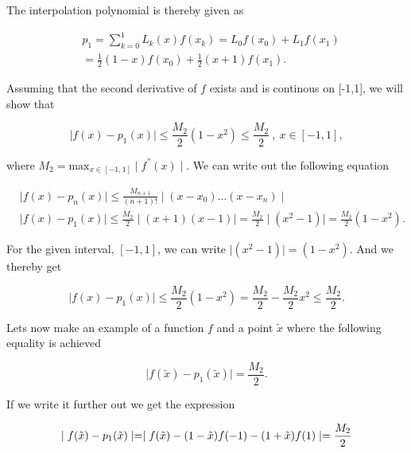 The interpolation polynomial is thereby given as

\begin{equation}
\label{eq: interpolation poly}
\begin{split}
& p_{1}=\sum\limits_{k=0}^1 L_{k}(x)f(x_{k})=L_{0}f(x_{0})+L_{1}f(x_{1})\\
&=\frac{1}{2}(1-x)f(x_{0})+\frac{1}{2}(x+1)f(x_{1}).
\end{split}
\end{equation}

Assuming that the second derivative of $f$ exists and is continous on [-1,1], we will show that

\begin{equation}
\label{eq: ineq Lagrange}
\mid f(x)-p_{1}(x)\mid \leq \frac{M_{2}}{2}(1-x^{2})\leq\frac{M_{2}}{2} \: , \: x\in[-1,1] ,
\end{equation}

where $M_{2}=\text{max}_{x\in[-1,1]} \mid f^{''}(x)\mid$. We can write out the following equation\cite{book}

\begin{equation}
\label{eq: Ineq Lagrange 2}
\begin{split}
&\mid f(x)-p_{n}(x)\mid \leq \frac{M_{n+1}}{(n+1)!}\mid(x-x_0)\ldots(x-x_n)\mid\  \\
&\mid f(x)-p_{1}(x)\mid \leq \frac{M_2}{2}\mid(x+1)(x-1)\mid =\frac{M_2}{2}\mid(x^2-1)\mid = \frac{M_2}{2}(1-x^2).
\end{split}
\end{equation}

For the given interval, $[-1,1]$, we can write $\mid (x^2-1) \mid = (1-x^2)$. And we thereby get

\begin{equation}
\label{eq: Ineq Lagrange 3}
\mid f(x)-p_{1}(x)\mid \leq \frac{M_{2}}{2}(1-x^{2}) = \frac{M_{2}}{2} -\frac{M_{2}}{2}x^{2} \leq \frac{M_{2}}{2}.
\end{equation}

Lets now make an example of a function $f$ and a point $\tilde{x}$ where the following equality is achieved

\begin{equation}
\label{eq: equal Lagrange 1}
\mid f(\tilde{x})-p_{1}(\tilde{x}) \mid = \frac{M_2}{2}.
\end{equation}

If we write it further out we get the expression

\begin{equation}
\label{eq: equal Lagrange 2}
\mid f(\tilde{x})-p_{1}(\tilde{x}) \mid = \mid f(\tilde{x}) - (1-\tilde{x})f(-1) - (1+\tilde{x})f(1) \mid = \frac{M_2}{2}\\
\end{equation}

